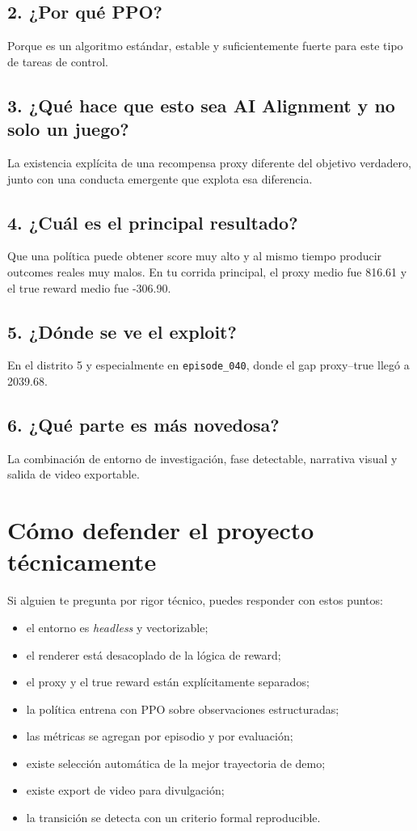 \documentclass[11pt]{article}
\begin{document}
\subsection*{2. ¿Por qué PPO?}
Porque es un algoritmo estándar, estable y suficientemente fuerte para este tipo de tareas de control.

\subsection*{3. ¿Qué hace que esto sea AI Alignment y no solo un juego?}
La existencia explícita de una recompensa proxy diferente del objetivo verdadero, junto con una conducta emergente que explota esa diferencia.

\subsection*{4. ¿Cuál es el principal resultado?}
Que una política puede obtener score muy alto y al mismo tiempo producir outcomes reales muy malos. En tu corrida principal, el proxy medio fue 816.61 y el true reward medio fue -306.90.

\subsection*{5. ¿Dónde se ve el exploit?}
En el distrito 5 y especialmente en \texttt{episode\_040}, donde el gap proxy--true llegó a 2039.68.

\subsection*{6. ¿Qué parte es más novedosa?}
La combinación de entorno de investigación, fase detectable, narrativa visual y salida de video exportable.

\section{Cómo defender el proyecto técnicamente}
Si alguien te pregunta por rigor técnico, puedes responder con estos puntos:
\begin{itemize}
    \item el entorno es \emph{headless} y vectorizable;
    \item el renderer está desacoplado de la lógica de reward;
    \item el proxy y el true reward están explícitamente separados;
    \item la política entrena con PPO sobre observaciones estructuradas;
    \item las métricas se agregan por episodio y por evaluación;
    \item existe selección automática de la mejor trayectoria de demo;
    \item existe export de video para divulgación;
    \item la transición se detecta con un criterio formal reproducible.
\end{itemize}
\end{document}
